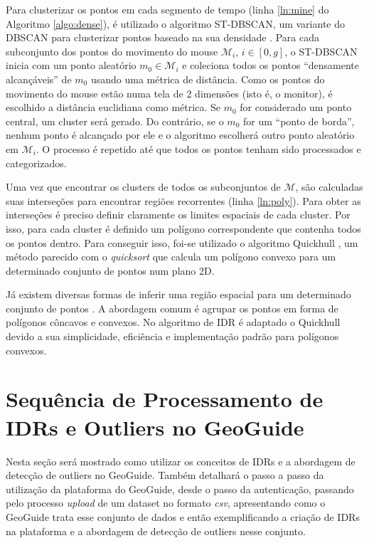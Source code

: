 Para clusterizar os pontos em cada segmento de tempo (linha \ref{ln:mine} do Algoritmo \ref{algo:dense}), é utilizado o algoritmo ST-DBSCAN, um variante do DBSCAN para clusterizar pontos baseado na sua densidade \cite{Birant:2007}. Para cada subconjunto dos pontos do movimento do mouse $\mathcal{M}_i$, $i \in [0,g]$, o ST-DBSCAN inicia com um ponto aleatório $m_0 \in \mathcal{M}_i$ e coleciona todos os pontos ``densamente alcançáveis'' de $m_0$ usando uma métrica de distância. Como os pontos do movimento do mouse estão numa tela de 2 dimensões (isto é, o monitor), é escolhido a distância euclidiana como métrica. Se $m_0$ for considerado um ponto central,  um cluster será gerado. Do contrário, se o $m_0$ for um ``ponto de borda'', nenhum ponto é alcançado por ele e o algoritmo escolherá outro ponto aleatório em $\mathcal{M}_i$. O processo é repetido até que todos os pontos tenham sido processados e categorizados.

Uma vez que encontrar os clusters de todos os subconjuntos de $\mathcal{M}$, são calculadas suas interseções para encontrar regiões recorrentes (linha \ref{ln:poly}). Para obter as interseções é preciso definir claramente os limites espaciais de cada cluster. Por isso, para cada cluster é definido um polígono correspondente que contenha todos os pontos dentro. Para conseguir isso, foi-se utilizado o algoritmo Quickhull \cite{Barber:1996}, um método parecido com o \textit{quicksort} que calcula um polígono convexo para um determinado conjunto de pontos num plano 2D.

Já existem diversas formas de inferir uma região espacial para um determinado conjunto de pontos \cite{Bevis1989,DUCKHAM2008,FADILI2004,ARAMPATZIS2006,Galton2006}. A abordagem comum é agrupar os pontos em forma de polígonos côncavos e convexos. No algoritmo de IDR é adaptado o Quickhull devido a sua simplicidade, eficiência e implementação padrão para polígonos convexos.

\section{Sequência de Processamento de IDRs e Outliers no GeoGuide}

Nesta seção será mostrado como utilizar os conceitos de IDRs e a abordagem de detecção de outliers no GeoGuide. Também detalhará o passo a passo da utilização da plataforma do GeoGuide, desde o passo da autenticação, passando pelo processo \textit{upload} de um dataset no formato \textit{csv}, apresentando como o GeoGuide trata esse conjunto de dados e então exemplificando a criação de IDRs na plataforma e a abordagem de detecção de outliers nesse conjunto.

